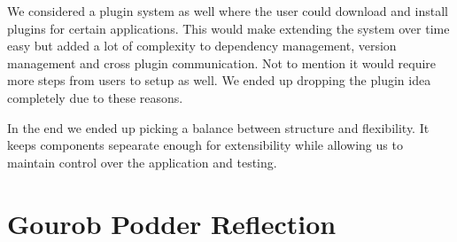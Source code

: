 \documentclass[12pt, titlepage]{article}
\begin{document}
\begin{enumerate}
We considered a plugin system as well where the user could download and install
plugins for certain applications. This would make extending the system over time
easy but added a lot of complexity to dependency management, version management
and cross plugin communication. Not to mention it would require more steps from
users to setup as well. We ended up dropping the plugin idea completely due to
these reasons.

In the end we ended up picking a balance between structure and flexibility. It
keeps components sepearate enough for extensibility while allowing us to maintain
control over the application and testing.

\end{enumerate}

\section*{Gourob Podder Reflection}
\end{document}
